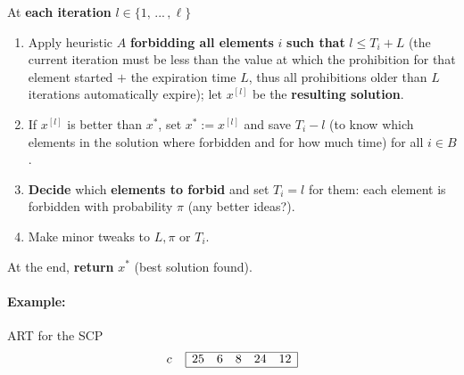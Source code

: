 \documentclass[11pt]{article}
\begin{document}
	At \textbf{each iteration} $l \in \{1, \, ... \, , \ell \}$
	\begin{enumerate}
		\item Apply heuristic $A$ \textbf{forbidding all elements} $i$ \textbf{such that} $l \leq T_i + L$ (the current iteration must be less than the value at which the prohibition for that element started $+$ the expiration time $L$, thus all prohibitions older than $L$ iterations automatically expire); let $x^{[l]}$ be the \textbf{resulting solution}.\\
		
		\item If $x^{[l]}$ is better than $x^\ast$, set $x^\ast := x^{[l]}$ and save $T_i - l$ (to know which elements in the solution where forbidden and for how much time) for all $i \in B$.\\
		
		\item \textbf{Decide} which \textbf{elements to forbid} and set $T_i = l$ for them: each element is forbidden with probability $\pi$ (any better ideas?).\\
		
		\item Make minor tweaks to $L, \pi$ or $T_i$.\\
	\end{enumerate}
	
	At the end, \textbf{return} $x^\ast$ (best solution found).\\
	
	\newpage
	
	\paragraph{Example:} ART for the SCP 
	$$
	c \;\;\;\;
	\begin{array}{| c c c c c |}
		\hline
		25 & 6 & 8 & 24 & 12 \\
		\hline
	\end{array}
	$$
	
\end{document}
